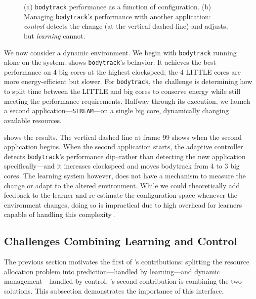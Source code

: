 \begin{figure}
\centering
  \subfloat[]
  {
    
    \label{fig:BODYTRACK_timeline}    
  }
  \caption{(a) \texttt{bodytrack} performance as a function of
    configuration. (b) Managing \texttt{bodytrack}'s performance with
    another application: \emph{control} detects the change (at the
    vertical dashed line) and adjusts, but \emph{learning} cannot. }
  \label{fig:control}
\end{figure}


We now consider a dynamic environment.  We begin with
\texttt{bodytrack} running alone on the system.
 shows \texttt{bodytrack}'s behavior.
It achieves the best performance on 4 big cores at the highest
clockspeed; the 4 LITTLE cores are more energy-efficient but slower.
For \texttt{bodytrack}, the challenge is determining how to split time
between the LITTLE and big cores to conserve energy while still
meeting the performance requirements. Halfway through its execution,
we launch a second application---\texttt{STREAM}---on a single big
core, dynamically changing available resources.

 shows the results.  The vertical
dashed line at frame 99 shows when the second application begins.
When the second application starts, the adaptive controller detects
\texttt{bodytrack}'s performance dip--rather than detecting the new
application specifically---and it increases clockspeed and moves
bodytrack from 4 to 3 big cores.  The learning system however, does
not have a mechanism to measure the change or adapt to the altered
environment.  While we could theoretically add feedback to the learner
and re-estimate the configuration space whenever the environment
changes, doing so is impractical due to high overhead for learners
capable of handling this complexity \cite{Paragon,quasar,LEO}.


\subsection{Challenges Combining Learning and Control}
The previous section motivates the first of \SYSTEM{}'s contributions:
splitting the resource allocation problem into prediction---handled by
learning---and dynamic management---handled by control. \SYSTEM{}'s
second contribution is combining the two solutions.  This subsection
demonstrates the importance of this interface.

